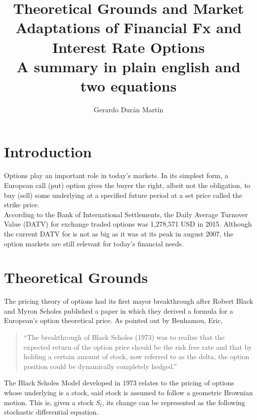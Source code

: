 
\usepackage{amsmath}
\usepackage[utf8]{inputenc}

\title{Theoretical Grounds and Market Adaptations of Financial Fx and Interest Rate Options \\ \large A summary in plain english and two equations}
\author{Gerardo Durán Martín}


\maketitle

\section{Introduction}
Options play an important role in today’s markets. In its simplest form, a European call (put) option gives the buyer the right, albeit not the obligation, to buy (sell) some underlying at a specified future period at a set price called the strike price.\\

According to the Bank of International Settlements, the Daily Average Turnover Value (DATV) for exchange traded options was 1,278,571 USD in 2015. Although the current DATV for is not as big as it was at its peak in august 2007, the option markets are still relevant for today’s financial needs.

\section{Theoretical Grounds}
The pricing theory of options had its first mayor breakthrough after Robert Black and Myron Scholes published a paper in which they derived a formula for a European’s option theoretical price. As pointed out by Benhamou, Eric,

\begin{quote}
``The breakthrough of Black Scholes (1973) was to realize that the expected return of the option price should be the risk free rate and that by holding a certain amount of stock, now referred to as the delta, the option position could be dynamically completely hedged.''
\end{quote}

The Black Scholes Model developed in 1973 relates to the pricing of options whose underlying is a stock, said stock is assumed to follow a geometric Brownian motion. This is, given a stock $S_t$, its change can be represented as the following stochastic differential equation.

